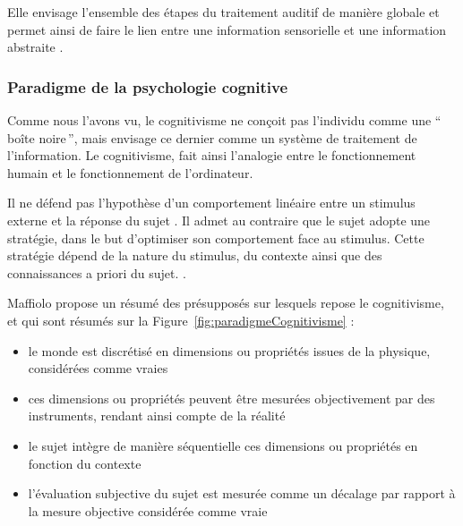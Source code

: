 Elle envisage l'ensemble des étapes du traitement auditif de manière globale et permet ainsi de faire le lien entre une information sensorielle et une information abstraite \citep{mcadams1994penser}.

\subsubsection{Paradigme de la psychologie cognitive}
Comme nous l'avons vu, le cognitivisme ne conçoit pas l'individu comme une ``\,boîte noire\,'', mais envisage ce dernier comme un système de traitement de l'information. Le cognitivisme, fait ainsi l'analogie entre le fonctionnement humain et le fonctionnement de l'ordinateur.

Il ne défend pas l'hypothèse d'un comportement linéaire entre un stimulus externe et la réponse du sujet . Il admet au contraire que le sujet adopte une stratégie, dans le but d'optimiser son comportement face au stimulus. Cette stratégie dépend de la nature du stimulus, du contexte ainsi que des connaissances a priori du sujet.
.

Maffiolo propose un résumé des présupposés sur lesquels repose le cognitivisme, et qui sont résumés sur la Figure~\ref{fig:paradigmeCognitivisme} \citep[p. ??]{maffiolo_caracterisation_1999} :


\begin{itemize}
\item le monde est discrétisé en dimensions ou propriétés issues de la physique,  considérées comme vraies
\item ces dimensions ou propriétés peuvent être mesurées objectivement par des instruments, rendant ainsi compte de la réalité 
\item le sujet intègre de manière séquentielle ces dimensions ou propriétés en fonction du contexte
\item l'évaluation subjective du sujet est mesurée comme un décalage par rapport à la mesure objective considérée comme vraie
\end{itemize}

